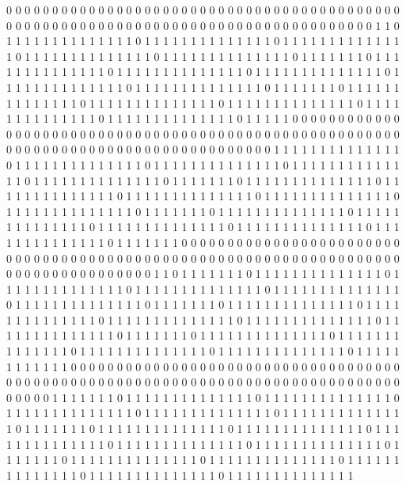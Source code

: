 0 0 0 0 0 0 0 0 0 0 0 0 0 0 0 0 0 0 0 0 0 0 0 0 0 0 0 0 0 0 0 0 0 0 0 0 0 0 0 0 0 0 0 0 0 0 0 0 0 0 0 0 0 0 0 0 0 0 0 0 0 0 0 0 0 0 0 0 0 0 0 0 0 0 0 0 0 0 0 0 0 0 0 
1 1 0 1 1 1 1 1 1 1 1 1 1 1 1 1 1 0 1 1 1 1 1 1 1 1 1 1 1 1 1 1 0 1 1 1 1 1 1 1 1 1 1 1 1 1 1 0 1 1 1 1 1 1 1 1 1 1 1 1 1 1 0 1 1 1 1 1 1 1 1 1 1 1 1 1 1 0 1 1 1 1 1 
1 1 0 1 1 1 1 1 1 1 1 1 1 1 1 1 1 0 1 1 1 1 1 1 1 1 1 1 1 1 1 1 0 1 1 1 1 1 1 1 1 1 1 1 1 1 1 0 1 1 1 1 1 1 1 1 1 1 1 1 1 1 0 1 1 1 1 1 1 1 1 1 1 1 1 1 1 0 1 1 1 1 1 
1 1 0 1 1 1 1 1 1 1 1 1 1 1 1 1 1 0 1 1 1 1 1 1 1 1 1 1 1 1 1 1 0 1 1 1 1 1 1 1 1 1 1 1 1 1 1 0 1 1 1 1 1 1 1 1 1 1 1 1 1 1 0 1 1 1 1 1 1 1 1 1 1 1 1 1 1 0 1 1 1 1 1 
0 0 0 0 0 0 0 0 0 0 0 0 0 0 0 0 0 0 0 0 0 0 0 0 0 0 0 0 0 0 0 0 0 0 0 0 0 0 0 0 0 0 0 0 0 0 0 0 0 0 0 0 0 0 0 0 0 0 0 0 0 0 0 0 0 0 0 0 0 0 0 0 0 0 0 0 0 0 0 0 0 0 0 
0 1 1 1 1 1 1 1 1 1 1 1 1 1 1 0 1 1 1 1 1 1 1 1 1 1 1 1 1 1 0 1 1 1 1 1 1 1 1 1 1 1 1 1 1 0 1 1 1 1 1 1 1 1 1 1 1 1 1 1 0 1 1 1 1 1 1 1 1 1 1 1 1 1 1 0 1 1 1 1 1 1 1 
0 1 1 1 1 1 1 1 1 1 1 1 1 1 1 0 1 1 1 1 1 1 1 1 1 1 1 1 1 1 0 1 1 1 1 1 1 1 1 1 1 1 1 1 1 0 1 1 1 1 1 1 1 1 1 1 1 1 1 1 0 1 1 1 1 1 1 1 1 1 1 1 1 1 1 0 1 1 1 1 1 1 1 
0 1 1 1 1 1 1 1 1 1 1 1 1 1 1 0 1 1 1 1 1 1 1 1 1 1 1 1 1 1 0 1 1 1 1 1 1 1 1 1 1 1 1 1 1 0 1 1 1 1 1 1 1 1 1 1 1 1 1 1 0 1 1 1 1 1 1 1 1 1 1 1 1 1 1 0 1 1 1 1 1 1 1 
0 0 0 0 0 0 0 0 0 0 0 0 0 0 0 0 0 0 0 0 0 0 0 0 0 0 0 0 0 0 0 0 0 0 0 0 0 0 0 0 0 0 0 0 0 0 0 0 0 0 0 0 0 0 0 0 0 0 0 0 0 0 0 0 0 0 0 0 0 0 0 0 0 0 0 0 0 0 0 0 0 0 0 
1 1 0 1 1 1 1 1 1 1 0 1 1 1 1 1 1 1 1 1 1 1 1 1 1 0 1 1 1 1 1 1 1 1 1 1 1 1 1 1 0 1 1 1 1 1 1 1 1 1 1 1 1 1 1 0 1 1 1 1 1 1 1 1 1 1 1 1 1 1 0 1 1 1 1 1 1 1 1 1 1 1 1 
1 1 0 1 1 1 1 1 1 1 0 1 1 1 1 1 1 1 1 1 1 1 1 1 1 0 1 1 1 1 1 1 1 1 1 1 1 1 1 1 0 1 1 1 1 1 1 1 1 1 1 1 1 1 1 0 1 1 1 1 1 1 1 1 1 1 1 1 1 1 0 1 1 1 1 1 1 1 1 1 1 1 1 
1 1 0 1 1 1 1 1 1 1 0 1 1 1 1 1 1 1 1 1 1 1 1 1 1 0 1 1 1 1 1 1 1 1 1 1 1 1 1 1 0 1 1 1 1 1 1 1 1 1 1 1 1 1 1 0 1 1 1 1 1 1 1 1 1 1 1 1 1 1 0 1 1 1 1 1 1 1 1 1 1 1 1 
0 0 0 0 0 0 0 0 0 0 0 0 0 0 0 0 0 0 0 0 0 0 0 0 0 0 0 0 0 0 0 0 0 0 0 0 0 0 0 0 0 0 0 0 0 0 0 0 0 0 0 0 0 0 0 0 0 0 0 0 0 0 0 0 0 0 0 0 0 0 0 0 0 0 0 0 0 0 0 0 0 0 0 
0 1 1 1 1 1 1 1 0 1 1 1 1 1 1 1 1 1 1 1 1 1 1 0 1 1 1 1 1 1 1 1 1 1 1 1 1 1 0 1 1 1 1 1 1 1 1 1 1 1 1 1 1 0 1 1 1 1 1 1 1 1 1 1 1 1 1 1 0 1 1 1 1 1 1 1 1 1 1 1 1 1 1 
0 1 1 1 1 1 1 1 0 1 1 1 1 1 1 1 1 1 1 1 1 1 1 0 1 1 1 1 1 1 1 1 1 1 1 1 1 1 0 1 1 1 1 1 1 1 1 1 1 1 1 1 1 0 1 1 1 1 1 1 1 1 1 1 1 1 1 1 0 1 1 1 1 1 1 1 1 1 1 1 1 1 1 
0 1 1 1 1 1 1 1 0 1 1 1 1 1 1 1 1 1 1 1 1 1 1 0 1 1 1 1 1 1 1 1 1 1 1 1 1 1 0 1 1 1 1 1 1 1 1 1 1 1 1 1 1 0 1 1 1 1 1 1 1 1 1 1 1 1 1 1 0 1 1 1 1 1 1 1 1 1 1 1 1 1 1 
